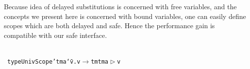 \documentclass[9pt,authoryear]{sigplanconf}
\begin{document}
%
Because idea of delayed substitutions is concerned with free
    variables, and the concepts we present here is concerned with bound
    variables, one can easily define scopes which are both delayed
    and safe. Hence the performance gain is compatible with our safe
    interface.%


%
%


{\nopagebreak }

%
%
%
~\\~\vphantom{$\{$}\texttt{type}\texttt{\mbox{\hspace{0.50em}}}\texttt{UnivScope{'}}\texttt{\mbox{\hspace{0.50em}}}\texttt{\mbox{\hspace{0.50em}}}\texttt{tm}\texttt{\mbox{\hspace{0.50em}}}\texttt{a}\texttt{\mbox{\hspace{0.50em}}}\texttt{{\char `\=}}\texttt{\mbox{\hspace{0.50em}}}\texttt{\makebox[1.22ex][c]{$ \forall $}}\texttt{v}\texttt{.}\texttt{\mbox{\hspace{0.50em}}}\texttt{\makebox[1.22ex][l]{$ {(} $}}\texttt{v}\texttt{\mbox{\hspace{0.50em}}}\texttt{$ \rightarrow $}\texttt{\mbox{\hspace{0.50em}}}\texttt{tm}\texttt{\mbox{\hspace{0.50em}}}\texttt{\makebox[1.22ex][l]{$ {(} $}}\texttt{tm}\texttt{\mbox{\hspace{0.50em}}}\texttt{a}\texttt{\mbox{\hspace{0.50em}}}\texttt{$ \vartriangleright $}\texttt{\mbox{\hspace{0.50em}}}\texttt{v}\texttt{\makebox[1.22ex][r]{$ {)} $}}\texttt{\makebox[1.22ex][r]{$ {)} $}}\texttt{{\nopagebreak \newline%
}}
\end{document}
